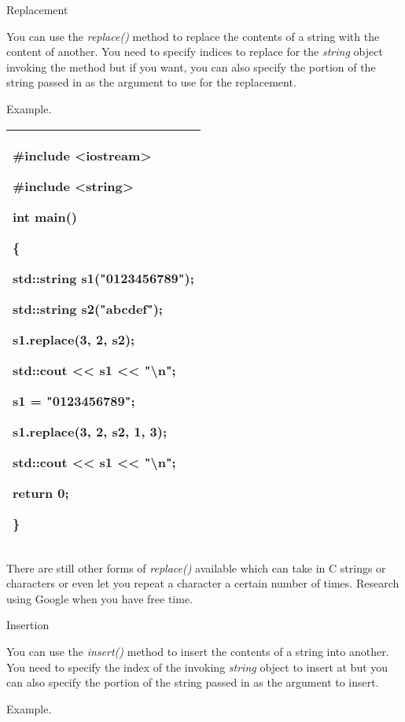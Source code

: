 \documentclass[
]{article}
\begin{document}
Replacement

You can use the \emph{replace()} method to replace the contents of a
string with the content of another. You need to specify indices to
replace for the \emph{string} object invoking the method but if you
want, you can also specify the portion of the string passed in as the
argument to use for the replacement.

Example.

\begin{longtable}[]{@{}l@{}}
\toprule
\endhead
\begin{minipage}[t]{0.97\columnwidth}\raggedright
\#include \textless iostream\textgreater{}

\#include \textless string\textgreater{}

int main()

\{

std::string s1("0123456789");

std::string s2("abcdef");

s1.replace(3, 2, s2);

std::cout \textless\textless{} s1 \textless\textless{}
"\textbackslash n";

s1 = "0123456789";

s1.replace(3, 2, s2, 1, 3);

std::cout \textless\textless{} s1 \textless\textless{}
"\textbackslash n";

return 0;

\}\strut
\end{minipage}\tabularnewline
\bottomrule
\end{longtable}

There are still other forms of \emph{replace()} available which can take
in C strings or characters or even let you repeat a character a certain
number of times. Research using Google when you have free time.

Insertion

You can use the \emph{insert()} method to insert the contents of a
string into another. You need to specify the index of the invoking
\emph{string} object to insert at but you can also specify the portion
of the string passed in as the argument to insert.

Example.
\end{document}
